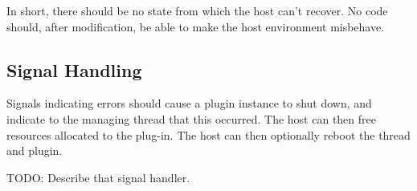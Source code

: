 In short, there should be no state from which the host can't recover. No code
should, after modification, be able to make the host environment misbehave.

\subsection {Signal Handling}

Signals indicating errors should cause a plugin instance to shut down, and
indicate to the managing thread that this occurred. The host can then free
resources allocated to the plug-in. The host can then optionally reboot the
thread and plugin.

TODO: Describe that signal handler.
